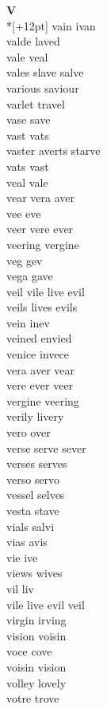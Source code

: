 \vspace{14pt}
\noindent\textbf{\Large V}\\*[+12pt]
vain ivan\\
valde laved\\
vale veal\\
vales slave salve\\
various saviour\\
varlet travel\\
vase save\\
vast vats\\
vaster averts starve\\
vats vast\\
veal vale\\
vear vera aver\\
vee eve\\
veer vere ever\\
veering vergine\\
veg gev\\
vega gave\\
veil vile live evil\\
veils lives evils\\
vein inev\\
veined envied\\
venice invece\\
vera aver vear\\
vere ever veer\\
vergine veering\\
verily livery\\
vero over\\
verse serve sever\\
verses serves\\
verso servo\\
vessel selves\\
vesta stave\\
vials salvi\\
vias avis\\
vie ive\\
views wives\\
vil liv\\
vile live evil veil\\
virgin irving\\
vision voisin\\
voce cove\\
voisin vision\\
volley lovely\\
votre trove\\

